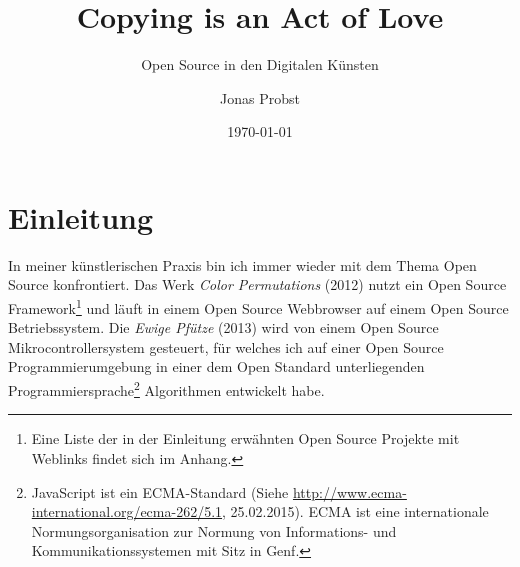 \documentclass[
paper=164mm:234mm, %
pagesize, %
DIV=calc, %
10pt, %
parskip=half- %
]{scrbook}
\begin{document}
\extratitle{\null \vfill
\texttt{[image: cc\_by\_sa]} \\
\footnotesize{\emph{Copying is an Act of Love. Open Source in den Digitalen Künsten} von Jonas Probst steht unter der Creative Commons Attribution-ShareAlike 4.0 International Lizenz. Die Weiterverwendung ist nur unter gleichen Bedingungen und mit Namensnennung möglich. Eine Kopie der Lizenz befindet sich unter \url{http://creativecommons.org/licenses/by-sa/4.0/}.\\
Diese Arbeit wurde in LaTeX verfasst, einer auf dem Open Source Textsatzsystem TeX beruhenden Auszeichnungssprache. Der Quellcode befindet sich unter \\
\url{http://github.com/jonasprobst/copying-is-an-act-of-love}.}
}


\title{Copying is an Act of Love}
\subtitle{Open Source in den Digitalen Künsten}
\author{Jonas Probst}


\date{\today}
\publishers{Hochschule der Künste Bern \\ MA Contemporary Arts Practice}
\lowertitleback{\normalsize{
Herzlichen Dank an\\
Andi Schoon, Rikka Feuz, Roger Villars, Micha Haarenberg und Hansjürg Wenger}}
\maketitle %

\newpage
\thispagestyle{empty}
\tableofcontents

{}
\chapter*{Einleitung}
In meiner künstlerischen Praxis bin ich immer wieder mit dem Thema Open Source konfrontiert. Das Werk \emph{Color Permutations} (2012) nutzt ein Open Source Framework\footnote{Eine Liste der in der Einleitung erwähnten Open Source Projekte mit Weblinks findet sich im Anhang.} und läuft in einem Open Source Webbrowser auf einem Open Source Betriebssystem. Die \emph{Ewige Pfütze} (2013) wird von einem Open Source Mikrocontrollersystem gesteuert, für welches ich auf einer Open Source Programmierumgebung in einer dem Open Standard unterliegenden Programmiersprache\footnote{JavaScript ist ein ECMA-Standard (Siehe \url{http://www.ecma-international.org/ecma-262/5.1}, 25.02.2015). ECMA ist eine internationale Normungsorganisation zur Normung von Informations- und Kommunikationssystemen mit Sitz in Genf.} Algorithmen entwickelt habe.
\end{document}
